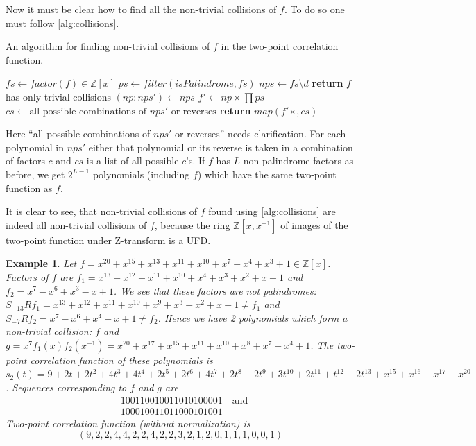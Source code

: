 \documentclass[12pt, a4paper]{article}
\newtheorem{example}{Example}
\begin{document}
Now it must be clear how to find all the non-trivial collisions of $f$. To do so
one must follow \cref{alg:collisions}.
\begin{algorithm}
  \caption{An algorithm for finding non-trivial collisions of $f$ in the
    two-point correlation function.}
  \label{alg:collisions}
  \begin{algorithmic}[1]
    \State $fs \gets factor(f) \in \mathbb{Z}[x]$
    \State $ps \gets filter(isPalindrome, fs)$
    \State $nps \gets fs \setminus d$
    \State \textbf{return} $f$ has only trivial collisions
    \EndIf
    \State $(np:nps') \gets nps$
    \State $f' \gets np \times \prod ps$
    \State $cs \gets \text{all possible combinations of $nps'$ or reverses}$
    \State \textbf{return} $map(f'\times, cs)$
    \EndProcedure
  \end{algorithmic}
\end{algorithm}
Here ``all possible combinations of $nps'$ or reverses'' needs
clarification. For each polynomial in $nps'$ either that polynomial or its
reverse is taken in a combination of factors $c$ and $cs$ is a list of all
possible $c$'s. If $f$ has $L$ non-palindrome factors as before, we get
$2^{L-1}$ polynomials (including $f$) which have the same two-point function as
$f$.

It is clear to see, that non-trivial collisions of $f$ found using
\cref{alg:collisions} are indeed all non-trivial collisions of $f$, because the
ring $\mathbb{Z}[x, x^{-1}]$ of images of the two-point function under
Z-transform is a UFD.

\begin{example}
  Let $f = x^{20} + x^{15} + x^{13} + x^{11} + x^{10} + x^7 + x^4 + x^3 + 1 \in \mathbb{Z}[x]$.
  Factors of $f$ are $f_1 = x^{13} + x^{12} + x^{11} + x^{10} + x^4 + x^3 + x^2 + x + 1$
  and $f_2 = x^7 - x^6 + x^3 - x + 1$. We see that these factors are not
  palindromes:
  $S_{-13}R f_1 = x^{13} + x^{12} + x^{11} + x^{10} + x^9 + x^3 + x^2 + x + 1 \ne f_1$ 
  and $S_{-7}R f_2 = x^7 - x^6 + x^4 - x + 1 \ne f_2$. Hence we have 2 polynomials
  which form a non-trivial collision: $f$ and
  $g = x^7 f_1(x) f_2(x^{-1}) = x^{20} + x^{17} + x^{15} + x^{11} + x^{10} + x^8 + x^7 + x^4 + 1$.
  The two-point correlation function of these polynomials is
  $s_2(t) = 9 + 2t + 2t^2 + 4t^3 + 4t^4 + 2t^5 + 2t^6 + 4t^7 + 2t^8 + 2t^9 +
  3t^{10} + 2t^{11} + t^{12} + 2t^{13} + x^{15} + x^{16} + x^{17} + x^{20}$.
  Sequences corresponding to $f$ and $g$ are
  \begin{align*}
    & 100110010011010100001 \quad \text{and} \\
    & 100010011011000101001
  \end{align*}
  Two-point correlation function (without normalization) is
  \begin{equation*}
    (9, 2, 2, 4, 4, 2, 2, 4, 2, 2, 3, 2, 1, 2, 0, 1, 1, 1, 0, 0, 1)
  \end{equation*}
\end{example}
\end{document}
